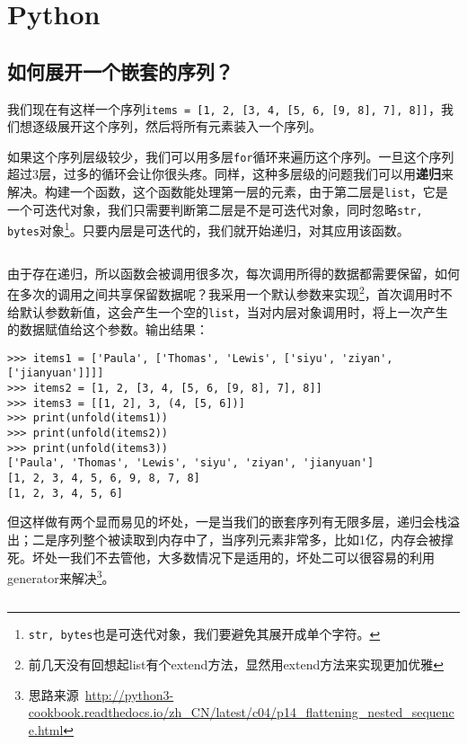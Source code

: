 \chapter{Python}

\section{如何展开一个嵌套的序列？}

我们现在有这样一个序列\texttt{items = [1, 2, [3, 4, [5, 6, [9, 8], 7], 8]]}，我们想逐级展开这个序列，然后将所有元素装入一个序列。

如果这个序列层级较少，我们可以用多层\texttt{for}循环来遍历这个序列。一旦这个序列超过3层，过多的循环会让你很头疼。同样，这种多层级的问题我们可以用\textbf{递归}来解决。构建一个函数，这个函数能处理第一层的元素，由于第二层是\texttt{list}，它是一个可迭代对象，我们只需要判断第二层是不是可迭代对象，同时忽略\texttt{str, bytes}对象\footnote{\texttt{str, bytes}也是可迭代对象，我们要避免其展开成单个字符。}。只要内层是可迭代的，我们就开始递归，对其应用该函数。

\inputminted{python}{code/python/unfold.py}

由于存在递归，所以函数会被调用很多次，每次调用所得的数据都需要保留，如何在多次的调用之间共享保留数据呢？我采用一个默认参数来实现\footnote{前几天没有回想起list有个extend方法，显然用extend方法来实现更加优雅}，首次调用时不给默认参数新值，这会产生一个空的\texttt{list}，当对内层对象调用时，将上一次产生的数据赋值给这个参数。输出结果：

\begin{verbatim}
>>> items1 = ['Paula', ['Thomas', 'Lewis', ['siyu', 'ziyan', ['jianyuan']]]]
>>> items2 = [1, 2, [3, 4, [5, 6, [9, 8], 7], 8]]
>>> items3 = [[1, 2], 3, (4, [5, 6])]
>>> print(unfold(items1))
>>> print(unfold(items2))
>>> print(unfold(items3))
['Paula', 'Thomas', 'Lewis', 'siyu', 'ziyan', 'jianyuan']
[1, 2, 3, 4, 5, 6, 9, 8, 7, 8]
[1, 2, 3, 4, 5, 6]
\end{verbatim}

但这样做有两个显而易见的坏处，一是当我们的嵌套序列有无限多层，递归会栈溢出；二是序列整个被读取到内存中了，当序列元素非常多，比如1亿，内存会被撑死。坏处一我们不去管他，大多数情况下是适用的，坏处二可以很容易的利用generator来解决\footnote{思路来源~\url{http://python3-cookbook.readthedocs.io/zh_CN/latest/c04/p14_flattening_nested_sequence.html}}。

\inputminted{python}{code/python/unfold_generator.py}

